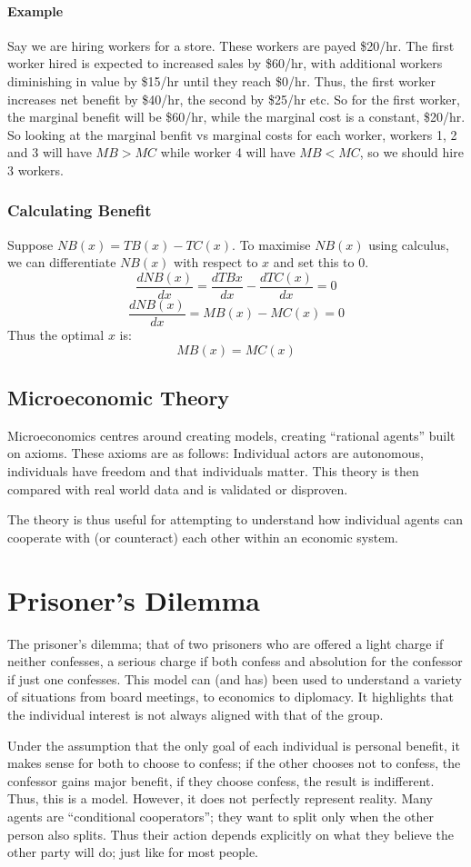 \documentclass[12pt]{report}
\begin{document}
\begin{flushleft}
\subsubsection*{Example}
Say we are hiring workers for a store. These workers are payed \$20/hr. The first worker hired is expected
to increased sales by \$60/hr, with additional workers diminishing in value by \$15/hr until they reach \$0/hr.
Thus, the first worker increases net benefit by \$40/hr, the second by \$25/hr etc. So for the first worker,
the marginal benefit will be \$60/hr, while the marginal cost is a constant, \$20/hr. So looking at the marginal 
benfit vs marginal costs for each worker, workers 1, 2 and 3 will have \(MB > MC\) while worker 4 will have \(MB < MC\), so 
we should hire 3 workers.

\subsection*{Calculating Benefit}
Suppose \(NB(x) = TB(x) - TC(x)\). To maximise \(NB(x)\) using calculus, we can differentiate \(NB(x)\) with respect
to \(x\) and set this to \(0\).
\[\frac{dNB(x)}{dx} = \frac{dTB{x}}{dx} - \frac{dTC(x)}{dx} = 0\]
\[\frac{dNB(x)}{dx} = MB(x) - MC(x) = 0\]
Thus the optimal \(x\) is:
\[MB(x) = MC(x)\]


\section*{Microeconomic Theory}
Microeconomics centres around creating models, creating ``rational agents'' built on axioms.
These axioms are as follows: Individual actors are autonomous, individuals have freedom and that individuals matter.
This theory is then compared with real world data and is validated or disproven.
\par
The theory is thus useful for attempting to understand how individual agents can cooperate
with (or counteract) each other within an economic system.

\chapter*{Prisoner's Dilemma}
The prisoner's dilemma; that of two prisoners who are offered a light charge if neither confesses,
a serious charge if both confess and absolution for the confessor if just one confesses.
This model can (and has) been used to understand a variety of situations from board meetings, 
to economics to diplomacy. It highlights that the individual interest is not always aligned with that of the group.
\par
Under the assumption that the only goal of each individual is personal benefit, it makes sense for both to
choose to confess; if the other chooses not to confess, the confessor gains major benefit, if they choose confess,
 the result is indifferent. Thus, this is a model. However, it does not perfectly represent reality. Many agents are
 ``conditional cooperators''; they want to split only when the other person also splits. Thus their action depends
 explicitly on what they believe the other party will do; just like for most people.
\par

\end{flushleft}
\end{document}
